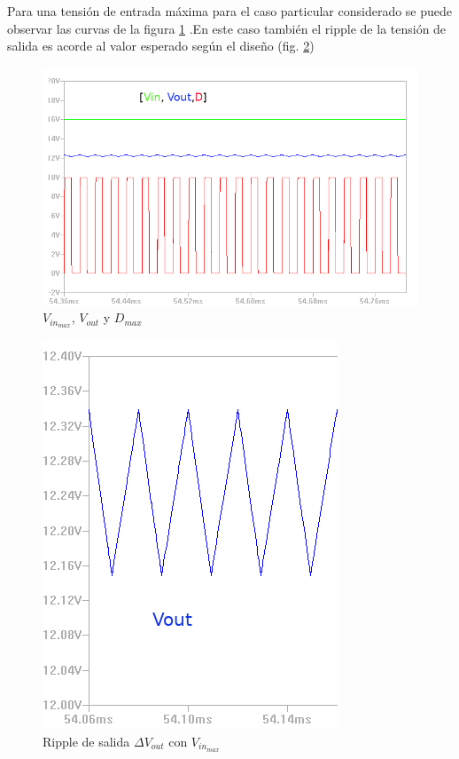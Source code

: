     
   Para una tensión de entrada máxima para el caso particular considerado se puede observar las curvas de la figura \ref{fig:Curvas Vin16V}  .En este caso también el ripple de la tensión de salida es acorde al valor esperado según el diseño (fig. \ref{fig: Ripple de salida VinMax})
   
    \begin{figure}[htbp]
            \centering
             \includegraphics[scale = 0.3]{Figuras/Curvas_Vin16V.png}
            \caption{$V_{in_{max}}$, $V_{out}$ y $D_{max}$}
            \label{fig:Curvas Vin16V}
      \end{figure}
      
      \begin{figure}[htbp]
            \centering
             \includegraphics[scale = 0.3]{Figuras/rippleVin16V.png}
            \caption{ Ripple de salida $\Delta V_{out}$ con $V_{in_{max}}$ }
            \label{fig: Ripple de salida VinMax}
      \end{figure}
   
